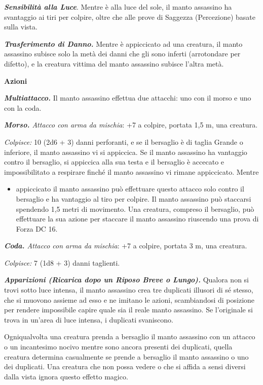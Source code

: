 \begin{multicols}{2}
\emph{\textbf{Sensibilità alla Luce}}. Mentre è alla luce del sole, il
manto assassino ha svantaggio ai tiri per colpire, oltre che alle prove
di Saggezza (Percezione) basate sulla vista.

\emph{\textbf{Trasferimento di Danno.}} Mentre è appiccicato ad una
creatura, il manto assassino subisce solo la metà dei danni che gli sono
inferti (arrotondare per difetto), e la creatura vittima del manto
assassino subisce l'altra metà.

\textbf{Azioni}

\emph{\textbf{Multiattacco.}} Il manto assassino effettua due attacchi:
uno con il morso e uno con la coda.

\emph{\textbf{Morso.} Attacco con arma da mischia}: +7 a colpire,
portata 1,5 m, una creatura.

\emph{Colpisce:} 10 (2d6 + 3) danni perforanti, e se il bersaglio è di
taglia Grande o inferiore, il manto assassino vi si appiccica. Se il
manto assassino ha vantaggio contro il bersaglio, si appiccica alla sua
testa e il bersaglio è accecato e impossibilitato a respirare finché il
manto assassino vi rimane appiccicato. Mentre


\begin{itemize}
\item
  appiccicato il manto assassino può effettuare questo attacco solo
  contro il bersaglio e ha vantaggio al tiro per colpire. Il manto
  assassino può staccarsi spendendo 1,5 metri di movimento. Una
  creatura, compreso il bersaglio, può effettuare la sua azione per
  staccare il manto assassino riuscendo una prova di Forza DC 16.
\end{itemize}


\emph{\textbf{Coda.} Attacco con arma da mischia}: +7 a colpire, portata
3 m, una creatura.

\emph{Colpisce:} 7 (1d8 + 3) danni taglienti.

\emph{\textbf{Apparizioni (Ricarica dopo un Riposo Breve o Lungo).}}
Qualora non si trovi sotto luce intensa, il manto assassino crea tre
duplicati illusori di sé stesso, che si muovono assieme ad esso e ne
imitano le azioni, scambiandosi di posizione per rendere impossibile
capire quale sia il reale manto assassino. Se l'originale si trova in
un'area di luce intensa, i duplicati svaniscono.

Ogniqualvolta una creatura prenda a bersaglio il manto assassino con un
attacco o un incantesimo nocivo mentre sono ancora presenti dei
duplicati, quella creatura determina casualmente se prende a bersaglio
il manto assassino o uno dei duplicati. Una creatura che non possa
vedere o che si affida a sensi diversi dalla vista ignora questo effetto
magico.


\end{multicols}
